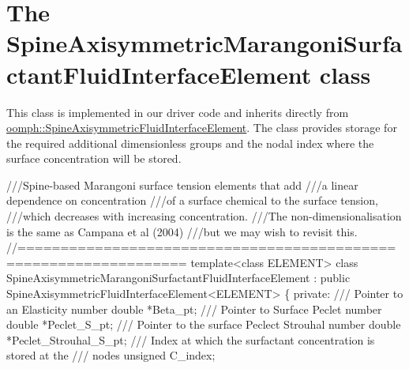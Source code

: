 \hypertarget{index_element}{}\section{The Spine\+Axisymmetric\+Marangoni\+Surfactant\+Fluid\+Interface\+Element class}\label{index_element}
This class is implemented in our driver code and inherits directly from \hyperlink{classoomph_1_1SpineAxisymmetricFluidInterfaceElement}{oomph\+::\+Spine\+Axisymmetric\+Fluid\+Interface\+Element}. The class provides storage for the required additional dimensionless groups and the nodal index where the surface concentration will be stored.  
\begin{DoxyCodeInclude}
\textcolor{comment}{///Spine-based Marangoni surface tension elements that add}
\textcolor{comment}{///a linear dependence on concentration}
\textcolor{comment}{}\textcolor{comment}{///of a surface chemical to the surface tension, }
\textcolor{comment}{}\textcolor{comment}{///which decreases with increasing concentration.}
\textcolor{comment}{}\textcolor{comment}{///The non-dimensionalisation is the same as Campana et al (2004)}
\textcolor{comment}{}\textcolor{comment}{///but we may wish to revisit this.}
\textcolor{comment}{}\textcolor{comment}{//=================================================================}
\textcolor{keyword}{template}<\textcolor{keyword}{class} ELEMENT>
\textcolor{keyword}{class }SpineAxisymmetricMarangoniSurfactantFluidInterfaceElement : 
  \textcolor{keyword}{public} SpineAxisymmetricFluidInterfaceElement<ELEMENT>
\{
\textcolor{keyword}{private}:\textcolor{comment}{}
\textcolor{comment}{ /// Pointer to an Elasticity number}
\textcolor{comment}{}  \textcolor{keywordtype}{double} *Beta\_pt;
\textcolor{comment}{}
\textcolor{comment}{ /// Pointer to Surface Peclet number}
\textcolor{comment}{}  \textcolor{keywordtype}{double} *Peclet\_S\_pt;
\textcolor{comment}{}
\textcolor{comment}{ /// Pointer to the surface Peclect Strouhal number}
\textcolor{comment}{}  \textcolor{keywordtype}{double} *Peclet\_Strouhal\_S\_pt;
\textcolor{comment}{}
\textcolor{comment}{ /// Index at which the surfactant concentration is stored at the}
\textcolor{comment}{ /// nodes}
\textcolor{comment}{} \textcolor{keywordtype}{unsigned} C\_index;

\end{DoxyCodeInclude}


